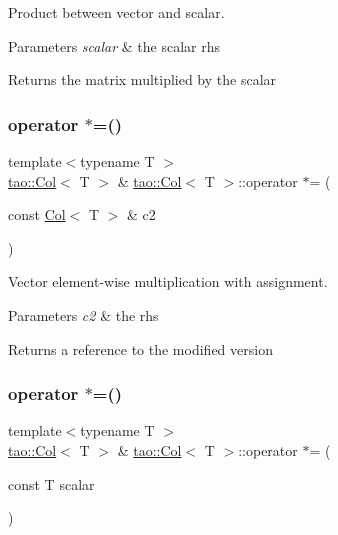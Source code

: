 Product between vector and scalar. 


\begin{DoxyParams}{Parameters}
{\em scalar} & the scalar rhs \\
\hline
\end{DoxyParams}
\begin{DoxyReturn}{Returns}
the matrix multiplied by the scalar 
\end{DoxyReturn}
\mbox{\label{classtao_1_1_col_a9274e5a0efd840c97741d05dca7bd5a2}} 
\subsubsection{\texorpdfstring{operator $\ast$=()}{operator *=()}\hspace{0.1cm}{\footnotesize\ttfamily [1/2]}}
{\footnotesize\ttfamily template$<$typename T $>$ \\
\mbox{\hyperlink{classtao_1_1_col}{tao\+::\+Col}}$<$ T $>$ \& \mbox{\hyperlink{classtao_1_1_col}{tao\+::\+Col}}$<$ T $>$\+::operator $\ast$= (\begin{DoxyParamCaption}\item[{const \mbox{\hyperlink{classtao_1_1_col}{Col}}$<$ T $>$ \&}]{c2 }\end{DoxyParamCaption})}



Vector element-\/wise multiplication with assignment. 


\begin{DoxyParams}{Parameters}
{\em c2} & the rhs \\
\hline
\end{DoxyParams}
\begin{DoxyReturn}{Returns}
a reference to the modified version 
\end{DoxyReturn}
\mbox{\label{classtao_1_1_col_a29c998087d6d7b98ecee1ba9fb7237a9}} 
\subsubsection{\texorpdfstring{operator $\ast$=()}{operator *=()}\hspace{0.1cm}{\footnotesize\ttfamily [2/2]}}
{\footnotesize\ttfamily template$<$typename T $>$ \\
\mbox{\hyperlink{classtao_1_1_col}{tao\+::\+Col}}$<$ T $>$ \& \mbox{\hyperlink{classtao_1_1_col}{tao\+::\+Col}}$<$ T $>$\+::operator $\ast$= (\begin{DoxyParamCaption}\item[{const T}]{scalar }\end{DoxyParamCaption})}



